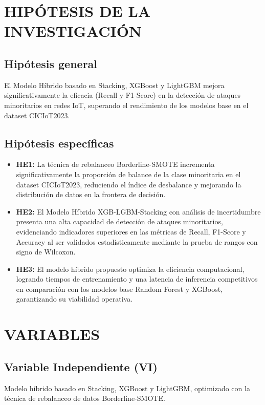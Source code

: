 \section{HIPÓTESIS DE LA INVESTIGACIÓN}

\subsection{Hipótesis general}
El Modelo Híbrido basado en Stacking, XGBoost y LightGBM mejora significativamente la eficacia (Recall y F1-Score) en la detección de ataques minoritarios en redes IoT, superando el rendimiento de los modelos base en el dataset CICIoT2023.

\subsection{Hipótesis específicas}
\begin{itemize}
\item \textbf{HE1:} La técnica de rebalanceo Borderline-SMOTE incrementa significativamente la proporción de balance de la clase minoritaria en el dataset CICIoT2023, reduciendo el índice de desbalance y mejorando la distribución de datos en la frontera de decisión.
\item \textbf{HE2:} El Modelo Híbrido XGB-LGBM-Stacking con análisis de incertidumbre presenta una alta capacidad de detección de ataques minoritarios, evidenciando indicadores superiores en las métricas de Recall, F1-Score y Accuracy al ser validados estadísticamente mediante la prueba de rangos con signo de Wilcoxon.
\item \textbf{HE3:} El modelo híbrido propuesto optimiza la eficiencia computacional, logrando tiempos de entrenamiento y una latencia de inferencia competitivos en comparación con los modelos base Random Forest y XGBoost, garantizando su viabilidad operativa.
\end{itemize}

\section{VARIABLES}

\subsection{Variable Independiente (VI)}
Modelo híbrido basado en Stacking, XGBoost y LightGBM, optimizado con la técnica de rebalanceo de datos Borderline-SMOTE.

